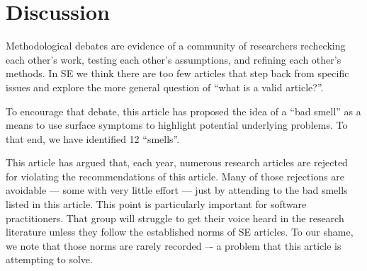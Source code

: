 \documentclass[10pt]{elsarticle}
\begin{document}


\section{Discussion} \label{Sec:Disc}

Methodological debates are evidence of a community of researchers rechecking each other's work, testing each other's assumptions, and refining each other's methods. 
In SE we think there are too few articles that step back from specific issues and explore the more general question of ``what is a valid article?''. 

To encourage that debate, this article has proposed the idea of a ``bad smell'' as a means to use surface symptoms to highlight potential underlying problems.  To that end, we have identified 12 ``smells''.

This article has argued that, each year, numerous research articles are rejected for violating the recommendations of this article. Many of those rejections are avoidable --- some with very little effort --- just by attending to the bad smells listed in this article.  This point is particularly important
for software practitioners.  That group will struggle to get their voice heard in the research literature unless they follow the established norms of SE articles.  To our shame, we note that those norms are rarely recorded –- a problem that this article is attempting to solve.
\end{document}
